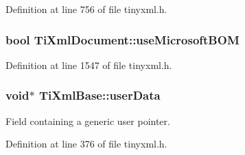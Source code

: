 Definition at line 756 of file tinyxml.h.

\hypertarget{classTiXmlDocument_a4d5400dec9bfb55c640428de33297886}{
\subsubsection[{useMicrosoftBOM}]{\setlength{\rightskip}{0pt plus 5cm}bool {\bf TiXmlDocument::useMicrosoftBOM}}}
\label{df/d09/classTiXmlDocument_a4d5400dec9bfb55c640428de33297886}


Definition at line 1547 of file tinyxml.h.

\hypertarget{classTiXmlBase_ab242c01590191f644569fa89a080d97c}{
\subsubsection[{userData}]{\setlength{\rightskip}{0pt plus 5cm}void$\ast$ {\bf TiXmlBase::userData}}}
\label{d8/d47/classTiXmlBase_ab242c01590191f644569fa89a080d97c}


Field containing a generic user pointer. 



Definition at line 376 of file tinyxml.h.

